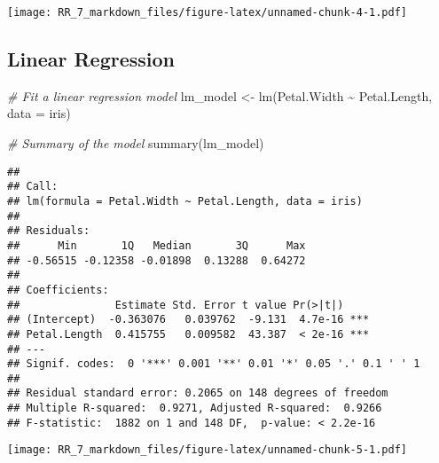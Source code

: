 \documentclass[
]{article}
\newenvironment{Shaded}{\begin{snugshade}}{\end{snugshade}}
\newcommand{\AttributeTok}[1]{\textcolor[rgb]{0.77,0.63,0.00}{#1}}
\newcommand{\CommentTok}[1]{\textcolor[rgb]{0.56,0.35,0.01}{\textit{#1}}}
\newcommand{\FunctionTok}[1]{\textcolor[rgb]{0.00,0.00,0.00}{#1}}
\newcommand{\NormalTok}[1]{#1}
\newcommand{\OtherTok}[1]{\textcolor[rgb]{0.56,0.35,0.01}{#1}}
\newcommand{\SpecialCharTok}[1]{\textcolor[rgb]{0.00,0.00,0.00}{#1}}
\newcommand{\StringTok}[1]{\textcolor[rgb]{0.31,0.60,0.02}{#1}}
\begin{document}
\texttt{[image: RR\_7\_markdown\_files/figure-latex/unnamed-chunk-4-1.pdf]}

\hypertarget{linear-regression}{%
\subsection{Linear Regression}\label{linear-regression}}

\begin{Shaded}
\begin{Highlighting}[]
\CommentTok{\# Fit a linear regression model}
\NormalTok{lm\_model }\OtherTok{\textless{}{-}} \FunctionTok{lm}\NormalTok{(Petal.Width }\SpecialCharTok{\textasciitilde{}}\NormalTok{ Petal.Length, }\AttributeTok{data =}\NormalTok{ iris)}

\CommentTok{\# Summary of the model}
\FunctionTok{summary}\NormalTok{(lm\_model)}
\end{Highlighting}
\end{Shaded}

\begin{verbatim}
## 
## Call:
## lm(formula = Petal.Width ~ Petal.Length, data = iris)
## 
## Residuals:
##      Min       1Q   Median       3Q      Max 
## -0.56515 -0.12358 -0.01898  0.13288  0.64272 
## 
## Coefficients:
##               Estimate Std. Error t value Pr(>|t|)    
## (Intercept)  -0.363076   0.039762  -9.131  4.7e-16 ***
## Petal.Length  0.415755   0.009582  43.387  < 2e-16 ***
## ---
## Signif. codes:  0 '***' 0.001 '**' 0.01 '*' 0.05 '.' 0.1 ' ' 1
## 
## Residual standard error: 0.2065 on 148 degrees of freedom
## Multiple R-squared:  0.9271, Adjusted R-squared:  0.9266 
## F-statistic:  1882 on 1 and 148 DF,  p-value: < 2.2e-16
\end{verbatim}

\begin{Shaded}
\end{Shaded}

\texttt{[image: RR\_7\_markdown\_files/figure-latex/unnamed-chunk-5-1.pdf]}
\end{document}
